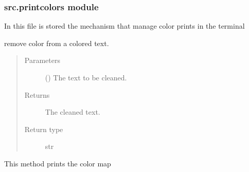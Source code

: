 \documentclass[a4paper,10pt,english]{sphinxmanual}
\begin{document}
\subsubsection{src.printcolors module}
\label{\detokenize{commands/apidoc/src:module-src.printcolors}}\label{\detokenize{commands/apidoc/src:src-printcolors-module}}
In this file is stored the mechanism that manage color prints in the terminal

\begin{fulllineitems}
\label{\detokenize{commands/apidoc/src:src.printcolors.cleancolor}}
remove color from a colored text.
\begin{quote}\begin{description}
\item[{Parameters}] \leavevmode
{} () \textendash{} The text to be cleaned.

\item[{Returns}] \leavevmode
The cleaned text.

\item[{Return type}] \leavevmode
str

\end{description}\end{quote}

\end{fulllineitems}


\begin{fulllineitems}
\label{\detokenize{commands/apidoc/src:src.printcolors.print_color_map}}
This method prints the color map

\end{fulllineitems}

\end{document}
